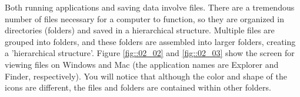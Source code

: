 \documentclass{ltjsbook}
\begin{document}
Both running applications and saving data involve files. There are a tremendous number of files necessary for a computer to function, so they are organized in directories (folders) and saved in a hierarchical structure. Multiple files are grouped into folders, and these folders are assembled into larger folders, creating a 'hierarchical structure'.
Figure \ref{fig::02_02} and \ref{fig::02_03} show the screen for viewing files on Windows and Mac (the application names are Explorer and Finder, respectively). You will notice that although the color and shape of the icons are different, the files and folders are contained within other folders.




\end{document}
